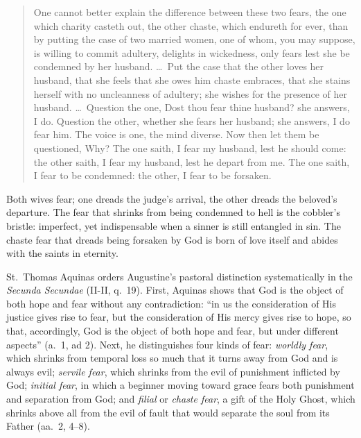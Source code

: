 \begin{quote}
One cannot better explain the difference between these two fears, the one which charity casteth out, the other chaste, which endureth for ever, than by putting the case of two married women, one of whom, you may suppose, is willing to commit adultery, delights in wickedness, only fears lest she be condemned by her husband. \dots\ Put the case that the other loves her husband, that she feels that she owes him chaste embraces, that she stains herself with no uncleanness of adultery; she wishes for the presence of her husband. \dots\ Question the one, Dost thou fear thine husband? she answers, I do. Question the other, whether she fears her husband; she answers, I do fear him. The voice is one, the mind diverse. Now then let them be questioned, Why? The one saith, I fear my husband, lest he should come: the other saith, I fear my husband, lest he depart from me. The one saith, I fear to be condemned: the other, I fear to be forsaken.
\end{quote}

Both wives fear; one dreads the judge's arrival, the other dreads the beloved's departure. The fear that shrinks from being condemned to hell is the cobbler's bristle: imperfect, yet indispensable when a sinner is still entangled in sin. The chaste fear that dreads being forsaken by God is born of love itself and abides with the saints in eternity.

St.\ Thomas Aquinas orders Augustine's pastoral distinction systematically in the \textit{Secunda Secundae} (II-II, q.\ 19). First, Aquinas shows that God is the object of both hope and fear without any contradiction: ``in us the consideration of His justice gives rise to fear, but the consideration of His mercy gives rise to hope, so that, accordingly, God is the object of both hope and fear, but under different aspects'' (a.\ 1, ad 2). Next, he distinguishes four kinds of fear: \textit{worldly fear}, which shrinks from temporal loss so much that it turns away from God and is always evil; \textit{servile fear}, which shrinks from the evil of punishment inflicted by God; \textit{initial fear}, in which a beginner moving toward grace fears both punishment and separation from God; and \textit{filial} or \textit{chaste fear}, a gift of the Holy Ghost, which shrinks above all from the evil of fault that would separate the soul from its Father (aa.\ 2, 4--8).

